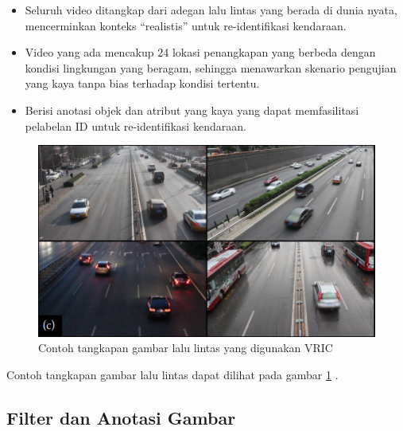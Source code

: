 \begin{itemize}[nolistsep]

  \item Seluruh video ditangkap dari adegan lalu lintas yang berada di dunia nyata, mencerminkan konteks “realistis” untuk re-identifikasi kendaraan.

  \item Video yang ada mencakup 24 lokasi penangkapan yang berbeda dengan kondisi lingkungan yang beragam, sehingga menawarkan skenario pengujian yang kaya tanpa bias terhadap kondisi 
  tertentu. 

  \item Berisi anotasi objek dan atribut yang kaya yang dapat memfasilitasi pelabelan ID untuk re-identifikasi kendaraan.

\end{itemize}

\begin{figure}[ht]
  \centering
  \includegraphics[scale=1]{gambar/Contoh lalu lintas VRIC.png}
  \caption{Contoh tangkapan gambar lalu lintas yang digunakan VRIC}
  \label{fig:contohtangkapangambarlalulintasyangdigunakanvric}
\end{figure}

Contoh tangkapan gambar lalu lintas dapat dilihat pada gambar \ref{fig:contohtangkapangambarlalulintasyangdigunakanvric} \parencite{Kanaci2018}.

\subsection{Filter dan Anotasi Gambar}

